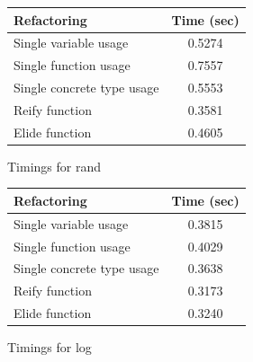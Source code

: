 \begin{figure}[h]
\centering
\begin{minipage}{.5\textwidth}
  \begin{center}
    \begin{tabular}{ | l | c |}
    \hline
    \textbf{Refactoring} & \textbf{Time (sec)} \\ \hline
    Single variable usage &  0.5274 \\ \hline
    Single function usage &  0.7557 \\ \hline
    Single concrete type usage  & 0.5553 \\ \hline
    Reify function &   0.3581 \\ \hline
    Elide function & 0.4605 \\ \hline
    \end{tabular}
\end{center}

\caption{Timings for rand}
\label{Fig:rand}
\end{minipage}%
\begin{minipage}{.5\textwidth}
\begin{center}
    \begin{tabular}{ | l | c |}
    \hline
    \textbf{Refactoring} & \textbf{Time (sec)} \\ \hline
    Single variable usage &  0.3815  \\ \hline
    Single function usage &   0.4029  \\ \hline
    Single concrete type usage  &  0.3638 \\ \hline
    Reify function &   0.3173 \\ \hline
    Elide function &  0.3240 \\ \hline
    \end{tabular}
\end{center}

\caption{Timings for log}
\label{Fig:log}
\end{minipage}
\end{figure}

